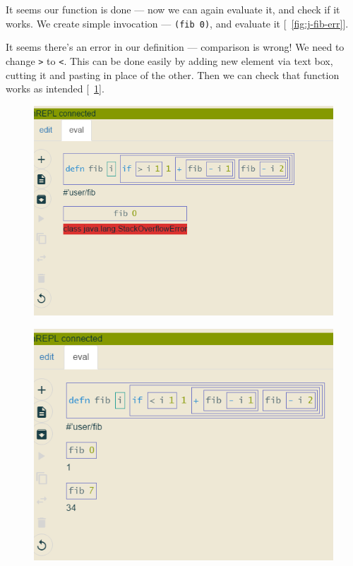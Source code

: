 \documentclass[11pt]{scrartcl}
\newcommand*{\figref}[1]{[\textbf{\figurename}~\ref{#1}]}
\begin{document}
It seems our function is done --- now we can again evaluate it, and check if it
works. We create simple invocation --- \lstinline{(fib 0)}, and evaluate it \figref{fig:j-fib-err}.

It seems there's an error in our definition --- comparison is wrong! We need to
change \lstinline{>} to \lstinline{<}. This can be done easily by adding new
element via text box, cutting it and pasting in place of the other. Then we can
check that function works as intended \figref{fig:j-fib-works}.

\begin{figure}[hbt]
  \centering
  \begin{minipage}{0.48\textwidth}
    \centering
    \includegraphics[scale=0.3]{img/j-fib-err}
\label{fig:j-fib-err}
  \end{minipage}
  \begin{minipage}{0.48\textwidth}
    \centering
    \includegraphics[scale=0.3]{img/j-fib-works}
\label{fig:j-fib-works}
  \end{minipage}
\end{figure}
\end{document}
